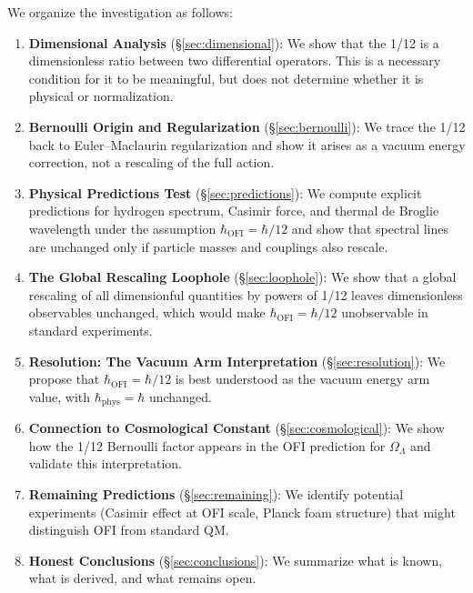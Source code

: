 \documentclass[12pt]{article}
\theoremstyle{definition}
\begin{document}
We organize the investigation as follows:
\begin{enumerate}
  \item \textbf{Dimensional Analysis} (\S\ref{sec:dimensional}): We show that the
    1/12 is a dimensionless ratio between two differential operators. This is
    a necessary condition for it to be meaningful, but does not determine whether
    it is physical or normalization.

  \item \textbf{Bernoulli Origin and Regularization} (\S\ref{sec:bernoulli}): We
    trace the 1/12 back to Euler--Maclaurin regularization and show it arises as
    a vacuum energy correction, not a rescaling of the full action.

  \item \textbf{Physical Predictions Test} (\S\ref{sec:predictions}): We compute
    explicit predictions for hydrogen spectrum, Casimir force, and thermal de Broglie
    wavelength under the assumption $\hbar_{\mathrm{OFI}} = \hbar/12$ and show that
    spectral lines are unchanged only if particle masses and couplings also rescale.

  \item \textbf{The Global Rescaling Loophole} (\S\ref{sec:loophole}): We show that
    a global rescaling of all dimensionful quantities by powers of 1/12 leaves
    dimensionless observables unchanged, which would make $\hbar_{\mathrm{OFI}} = \hbar/12$
    unobservable in standard experiments.

  \item \textbf{Resolution: The Vacuum Arm Interpretation} (\S\ref{sec:resolution}):
    We propose that $\hbar_{\mathrm{OFI}} = \hbar/12$ is best understood as the
    vacuum energy arm value, with $\hbar_{\mathrm{phys}} = \hbar$ unchanged.

  \item \textbf{Connection to Cosmological Constant} (\S\ref{sec:cosmological}):
    We show how the 1/12 Bernoulli factor appears in the OFI prediction for
    $\Omega_\Lambda$ and validate this interpretation.

  \item \textbf{Remaining Predictions} (\S\ref{sec:remaining}): We identify potential
    experiments (Casimir effect at OFI scale, Planck foam structure) that might
    distinguish OFI from standard QM.

  \item \textbf{Honest Conclusions} (\S\ref{sec:conclusions}): We summarize what
    is known, what is derived, and what remains open.
\end{enumerate}
\end{document}
